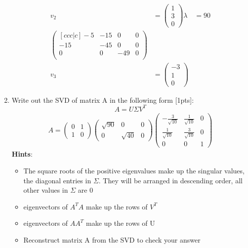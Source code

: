\documentclass{article}
\begin{document}
\begin{enumerate}[label=(\alph*)]
\begin{align*}
    v_2 &= \begin{pmatrix}
        1 \\ 3 \\ 0
    \end{pmatrix}
    \lambda  &= 90 \\
    \begin{pmatrix}[ccc|c]
        -5  & -15  &   0  & 0\\
        -15  &  -45   &  0 & 0 \\
        0   &  0  &   -49  & 0 \\
    \end{pmatrix} \\
    v_3 &= \begin{pmatrix}
        -3 \\ 1 \\ 0
    \end{pmatrix}
\end{align*}
\item Write out the SVD of matrix A in the following form  [1pts]: $$A=U\Sigma V^{T}$$ \newline \begin{align*}
    A = \begin{pmatrix}
        0 & 1 \\ 1 & 0
    \end{pmatrix}\begin{pmatrix}
        \sqrt{90} & 0 & 0\\
        0 & \sqrt{40} & 0
    \end{pmatrix}\begin{pmatrix}
        -\frac{3}{\sqrt{10}} & \frac{1}{\sqrt{10}} & 0 \\
        \frac{1}{\sqrt{10}} & \frac{3}{\sqrt{10}} & 0 \\
        0 & 0 & 1
    \end{pmatrix}
\end{align*}\textbf{Hints}:
\begin{itemize}
\item The square roots of the positive eigenvalues make up the singular values, the diagonal entries in $\Sigma$. They will be arranged in descending order, all other values in $\Sigma$ are $0$
\item eigenvectors of $A^{T}A$ make up the rows of $V^{T}$ 
\item eigenvectors of $AA^{T}$ make up the  rows of U
\item Reconstruct matrix A from the SVD to check your answer
\end{itemize}
\end{enumerate}
\end{document}
